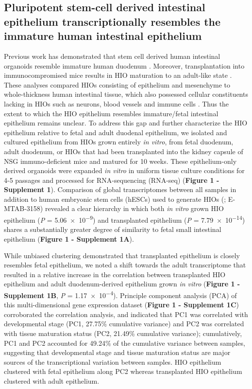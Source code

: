 \documentclass[9pt,lineo]{elife}
\begin{document}
\subsection*{{\bfseries\sffamily } Pluripotent stem-cell derived intestinal epithelium transcriptionally resembles the immature human intestinal epithelium}
\label{sec:orgheadline2}
Previous work has demonstrated that stem cell derived human intestinal organoids resemble immature human duodenum \citep{Watson:2014,Finkbeiner:2015,Tsai:2017}. Moreover, transplantation into immunocompromised mice results in HIO maturation to an adult-like state \citep{Watson:2014,Finkbeiner:2015}. These analyses compared HIOs consisting of epithelium and mesenchyme to whole-thickness human intestinal tissue, which also possessed cellular constituents lacking in HIOs such as neurons, blood vessels and immune cells  \citep{Finkbeiner:2015}. Thus the extent to which the HIO epithelium resembles immature/fetal intestinal epithelium remains unclear. To address this gap and further characterize the HIO epithelium relative to fetal and adult duodenal epithelium, we isolated and cultured epithelium from HIOs grown entirely \emph{in vitro}, from fetal duodenum, adult duodenum, or HIOs that had been transplanted into the kidney capsule of NSG immuno-deficient mice and matured for 10 weeks. These epithelium-only derived organoids were expanded \emph{in vitro} in uniform tissue culture conditions for 4-5 passages and processed for RNA-sequencing (RNA-seq) (\textbf{Figure 1 - Supplement 1}). Comparison of global transcriptomes between all samples in addition to human embryonic stem cells (hESCs) used to generate HIOs (\citealt{Finkbeiner:2015}; E-MTAB-3158) revealed a clear hierarchy in which both \emph{in vitro} grown HIO epithelium (\emph{P} = \num{5.06e-9}) and transplanted epithelium (\emph{P} = \num{7.79e-14}) shares a substantially greater degree of similarity to fetal small intestinal epithelium (\textbf{Figure 1 - Supplement 1A}). 

While unbiased clustering demonstrated that transplanted epithelium is closely resembles fetal epithelium, we noted a shift towards the adult transcriptome that resulted in a relative increase in the correlation between transplanted HIO epithelium and adult duodenum-derived epithelium grown \emph{in vitro}  (\textbf{Figure 1 - Supplement 1B}, \emph{P} = \num{1.17e-4}). Principle component analysis (PCA) of this multi-dimensional gene expression dataset (\textbf{Figure 1 - Supplement 1C}) corroborated the correlation analysis, and indicated that PC1 was correlated with developmental stage (PC1, 27.75\% cumulative variance) and PC2 was correlated with tissue maturation status (PC2, 21.49\% cumulative variance); cumulatively, PC1 and PC2 accounted for 49.24\% of the cumulative variance between samples, suggesting that developmental stage and tissue maturation status are major sources of the transcriptional variation between samples. HIO epithelium clustered with fetal epithelium along PC2 whereas transplanted HIO epithelium clustered with adult epithelium.
\end{document}
